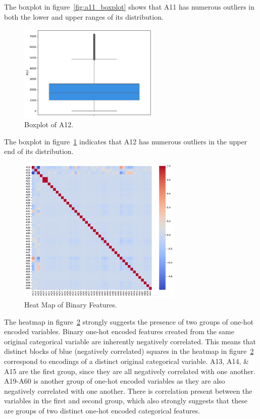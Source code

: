 \documentclass[11pt]{report}
\begin{document}
The boxplot in figure~\ref{fig:a11_boxplot} shows that A11 has numerous outliers in both the lower and upper ranges of its distribution.

\begin{figure}[H]
    \centering
    \includegraphics[width=0.6\textwidth]{images/A12_boxplot.pdf}
    \caption{Boxplot of A12.}
    \label{fig:a12_boxplot}
\end{figure}

The boxplot in figure~\ref{fig:a12_boxplot} indicates that A12 has numerous outliers in the upper end of its distribution.

\begin{figure}[H]
    \centering
    \includegraphics[width=0.7\textwidth]{images/binary_heatmap.pdf}
    \caption{Heat Map of Binary Features.}
    \label{fig:binary_heatmap}
\end{figure}

The heatmap in figure~\ref{fig:binary_heatmap} strongly suggests the presence of two groups of one-hot encoded variables. Binary one-hot encoded features created from the same original categorical variable are inherently negatively correlated. This means that distinct blocks of blue (negatively correlated) squares in the heatmap in figure~\ref{fig:binary_heatmap} correspond to encodings of a distinct original categorical variable. A13, A14, \& A15 are the first group, since they are all negatively correlated with one another. A19-A60 is another group of one-hot encoded variables as they are also negatively correlated with one another. There is correlation present between the variables in the first and second group, which also strongly suggests that these are groups of two distinct one-hot encoded categorical features.
\end{document}
